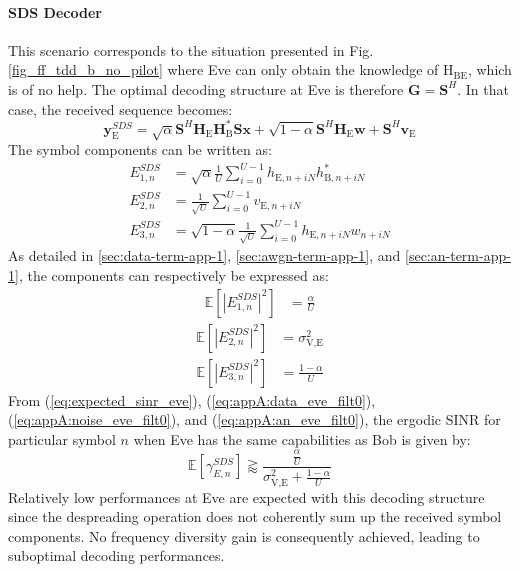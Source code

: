 \documentclass[12pt, draftclsnofoot, onecolumn]{IEEEtran}
\newcommand{\EX}[1]{\mathbb{E} \left[#1\right]}%
\newcommand{\HE}{\textbf{H}_{\text{E}}}
\newcommand{\ve}{\textbf{v}_{\text{E}}}
\newcommand{\spread}{\textbf{S}}
\newcommand{\w}{\textbf{w}}
\newcommand{\mat}[1]{\boldsymbol{\mathrm{#1}}}
\begin{document}
\paragraph{SDS Decoder}
\label{sec:same-decoding-strucure-as-bob}
This scenario corresponds to the situation presented in Fig.\ref{fig_ff_tdd_b_no_pilot} where Eve can only obtain the knowledge of $\mat{H}_{\text{BE}}$, which is of no help. The optimal decoding structure at Eve is therefore $\textbf{G}=\spread^H$. In that case, the received sequence becomes:
\begin{equation}
\textbf{y}_{\text{E}}^{SDS} = \sqrt{\alpha} \spread^H \HE \textbf{H}^*_{\text{B}} \spread\textbf{x} + \sqrt{1-\alpha} \spread^H \HE \w  +  \spread^H  \ve 
\label{eq:rx_eve_filt0}
\end{equation}
The symbol components can be written as:
\begin{equation}
\begin{split}
E_{1,n}^{SDS} &= \sqrt{\alpha}\frac{1}{U}\sum_{i=0}^{U-1}  h_{\text{E}, n + iN} h^*_{\text{B}, n + iN} \\
E_{2,n}^{SDS} &= \frac{1}{\sqrt{U}}\sum_{i=0}^{U-1}  v_{\text{E}, n + iN}\\
E_{3,n}^{SDS} &= \sqrt{1-\alpha}\frac{1}{\sqrt{U}}\sum_{i=0}^{U-1}  h_{\text{E}, n + iN}w_{n + iN}
\end{split}
\end{equation}
As detailed in  \ref{sec:data-term-app-1},  \ref{sec:awgn-term-app-1}, and \ref{sec:an-term-app-1}, the components can respectively be expressed as:
\begin{equation}
	\begin{split}
	\EX{|E_{1,n}^{SDS}|^2}&= \frac{\alpha}{U}
	\end{split}
	\label{eq:appA:data_eve_filt0}
\end{equation} 
\begin{equation}
	\begin{split}
	\EX{|E_{2,n}^{SDS}|^2} &=\sigma^2_{\text{V,E}}
	\end{split}
	\label{eq:appA:noise_eve_filt0}
\end{equation} 
\begin{equation}
	\begin{split}
	\EX{|E_{3,n}^{SDS}|^2}  &= \frac{1-\alpha}{U}
	\end{split}
	\label{eq:appA:an_eve_filt0}
\end{equation}
From (\ref{eq:expected_sinr_eve}), (\ref{eq:appA:data_eve_filt0}), (\ref{eq:appA:noise_eve_filt0}), and (\ref{eq:appA:an_eve_filt0}), the ergodic SINR for particular symbol $n$ when Eve has the same capabilities as Bob is given by:
\begin{equation}
\EX{\gamma_{E,n}^{SDS}} \gtrapprox \frac{\frac{\alpha}{U}}{\sigma^2_{\text{V,E}}+\frac{1-\alpha}{U}}
\label{eq:sinr_eve_filt0}
\end{equation}
Relatively low performances at Eve are expected with this decoding structure since the despreading operation does not coherently sum up the received symbol components. No frequency diversity gain is consequently achieved, leading to suboptimal decoding performances.
\end{document}
